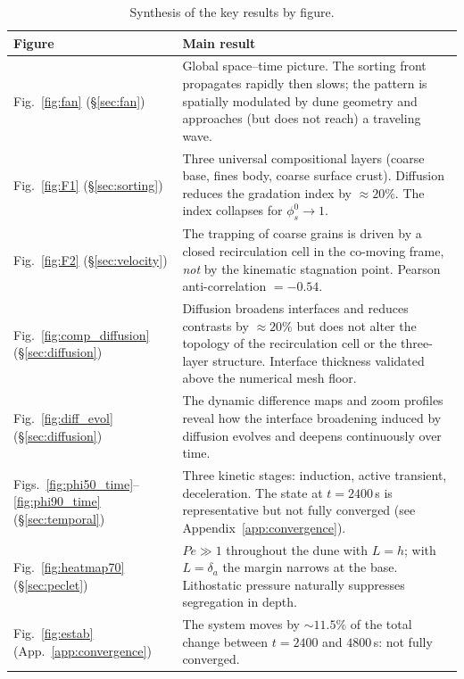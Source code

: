 \documentclass[12pt, a4paper]{article}
\begin{document}
\begin{table}[H]
    \centering
    \renewcommand{\arraystretch}{1.4}
    \begin{tabular}{lp{10cm}}
        \toprule
        Figure & Main result \\
        \midrule
        Fig.~\ref{fig:fan} (§\ref{sec:fan}) &
            Global space--time picture. The sorting front propagates rapidly
            then slows; the pattern is spatially modulated by dune geometry
            and approaches (but does not reach) a traveling wave. \\
        Fig.~\ref{fig:F1} (§\ref{sec:sorting}) &
            Three universal compositional layers (coarse base, fines body,
            coarse surface crust). Diffusion reduces the gradation index by
            $\approx 20\%$. The index collapses for $\phi_s^0 \to 1$. \\
        Fig.~\ref{fig:F2} (§\ref{sec:velocity}) &
            The trapping of coarse grains is driven by a closed recirculation
            cell in the co-moving frame, \emph{not} by the kinematic
            stagnation point. Pearson anti-correlation $= -0.54$. \\
        Fig.~\ref{fig:comp_diffusion} (§\ref{sec:diffusion}) &
            Diffusion broadens interfaces and reduces contrasts by $\approx 20\%$
            but does not alter the topology of the recirculation cell or
            the three-layer structure. Interface thickness validated above
            the numerical mesh floor. \\
        Fig.~\ref{fig:diff_evol} (§\ref{sec:diffusion}) &
            The dynamic difference maps and zoom profiles reveal how the interface broadening induced by diffusion evolves and deepens continuously over time. \\
        Figs.~\ref{fig:phi50_time}--\ref{fig:phi90_time} (§\ref{sec:temporal}) &
            Three kinetic stages: induction, active transient, deceleration.
            The state at $t = 2400$\,s is representative but not fully
            converged (see Appendix~\ref{app:convergence}). \\
        Fig.~\ref{fig:heatmap70} (§\ref{sec:peclet}) &
            $Pe \gg 1$ throughout the dune with $L = h$; with $L = \delta_a$
            the margin narrows at the base. Lithostatic pressure naturally
            suppresses segregation in depth. \\
        Fig.~\ref{fig:estab} (App.~\ref{app:convergence}) &
            The system moves by $\sim 11.5\%$ of the total change between
            $t = 2400$ and $4800$\,s: not fully converged. \\
        \bottomrule
    \end{tabular}
    \caption{Synthesis of the key results by figure.}
    \label{tab:summary}
\end{table}
\end{document}

